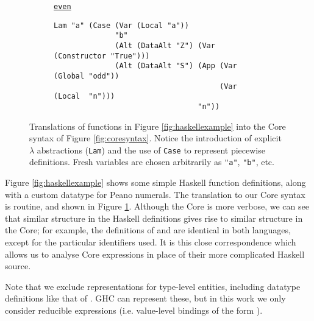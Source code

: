 \begin{figure}
\begin{subfigure}[even]{\textwidth}
    \begin{small}
      \underline{\texttt{even}}
      \begin{verbatim}
Lam "a" (Case (Var (Local "a"))
              "b"
              (Alt (DataAlt "Z") (Var (Constructor "True")))
              (Alt (DataAlt "S") (App (Var (Global "odd"))
                                      (Var (Local  "n")))
                                 "n"))
      \end{verbatim}
    \end{small}
  \end{subfigure}
  \caption{Translations of functions in Figure \ref{fig:haskellexample} into the
    Core syntax of Figure \ref{fig:coresyntax}. Notice the introduction of
    explicit $\lambda$ abstractions (\texttt{Lam}) and the use of \texttt{Case}
    to represent piecewise definitions. Fresh variables are chosen arbitrarily
    as \texttt{"a"}, \texttt{"b"}, etc.}
  \label{fig:coreexample}
\end{figure}

Figure \ref{fig:haskellexample} shows some simple Haskell function definitions,
along with a custom datatype for Peano numerals. The translation to our Core
syntax is routine, and shown in Figure \ref{fig:coreexample}. Although the Core
is more verbose, we can see that similar structure in the Haskell definitions
gives rise to similar structure in the Core; for example, the definitions of
 and  are identical in both languages, except for the
particular identifiers used. It is this close correspondence which allows us to
analyse Core expressions in place of their more complicated Haskell source.

Note that we exclude representations for type-level entities, including datatype
definitions like that of . GHC can represent these, but in this work we
only consider reducible expressions (i.e. value-level bindings of the form
\mbox{}).
